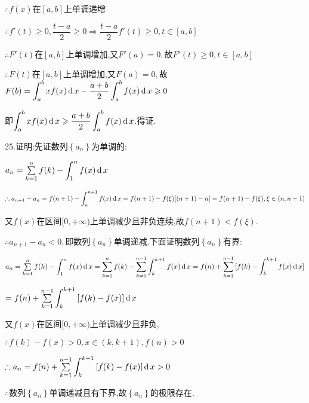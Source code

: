 $\therefore f(x)$在$[a,b]$上单调递增

$\therefore f'(t) \ge 0,\dfrac{{t - a}}{2} \ge 0 \Rightarrow \dfrac{{t - a}}{2}f'(t) \ge 0,t \in [a,b]$

$\therefore F'(t)$在$[a,b]$上单调增加,又$F'(a) = 0,$故$F'(t) \ge 0,t \in [a,b]$

$\therefore F(t)$在$[a,b]$上单调增加,又$F(a) = 0,$故$F(b) = \displaystyle\int_a^b {xf(x)\operatorname{\mathop{}\!\mathrm{d}} x}  - \dfrac{{a + b}}{2}\displaystyle\int_a^b {f(x)\operatorname{\mathop{}\!\mathrm{d}} x}  \geqslant 0$

即$\displaystyle\int_a^b {xf(x)\operatorname{\mathop{}\!\mathrm{d}} x}  \geqslant \dfrac{{a + b}}{2}\displaystyle\int_a^b {f(x)\operatorname{\mathop{}\!\mathrm{d}} x} $.得证.

25.证明:先证数列$\left\{ {{a_n}} \right\}$为单调的:

${a_n} = \sum\limits_{k = 1}^n {f(k)}  - \displaystyle\int_1^n {f(x)\operatorname{\mathop{}\!\mathrm{d}} x} $

$\therefore {a_{n + 1}} - {a_n} = f(n + 1) - \displaystyle\int_n^{n + 1} {f(x)\operatorname{\mathop{}\!\mathrm{d}} x}  = f(n + 1) - f(\xi )[(n + 1) - n] = f(n + 1) - f(\xi ),\xi  \in (n,n + 1)$

又$f(x)$在区间$[0, + \infty )$上单调减少且非负连续,故$f(n + 1) < f(\xi ).$

$\therefore {a_{n + 1}} - {a_n} < 0,$即数列$\left\{ {{a_n}} \right\}$单调递减.下面证明数列$\left\{ {{a_n}} \right\}$有界:

${a_n} = \sum\limits_{k = 1}^n {f(k)}  - \displaystyle\int_1^n {f(x)\operatorname{\mathop{}\!\mathrm{d}} x}  = \sum\limits_{k = 1}^n {f(k)}  - \sum\limits_{k = 1}^{n - 1} {\displaystyle\int_k^{k + 1} {f(x)\operatorname{\mathop{}\!\mathrm{d}} x} }  = f(n) + \sum\limits_{k = 1}^{n - 1} {[f(k) - \displaystyle\int_k^{k + 1} {f(x)\operatorname{\mathop{}\!\mathrm{d}} x} ]} $

$ = f(n) + \sum\limits_{k = 1}^{n - 1} {\displaystyle\int_k^{k + 1} {[f(k) - f(x)]\operatorname{\mathop{}\!\mathrm{d}} x} } $

又$f(x)$在区间$[0, + \infty )$上单调减少且非负,

$\therefore f(k) - f(x) > 0,x \in (k,k + 1),f(n) > 0$

$\therefore {a_n} = f(n) + \sum\limits_{k = 1}^{n - 1} {\displaystyle\int_k^{k + 1} {[f(k) - f(x)]\operatorname{\mathop{}\!\mathrm{d}} x} }  > 0$

$\therefore$数列$\left\{ {{a_n}} \right\}$单调递减且有下界,故$\left\{ {{a_n}} \right\}$的极限存在.






































